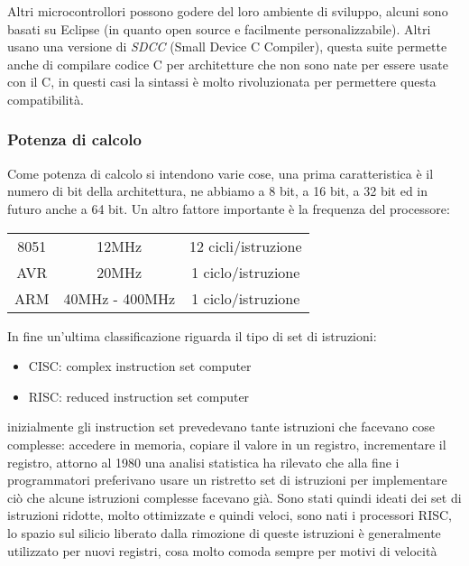 Altri microcontrollori possono godere del loro ambiente di sviluppo, alcuni sono basati su Eclipse (in quanto open source e facilmente personalizzabile). Altri usano una versione di \emph{SDCC} (Small Device C Compiler), questa suite permette anche di compilare codice C per architetture che non sono nate per essere usate con il C, in questi casi la sintassi è molto rivoluzionata per permettere questa compatibilità.

\subsubsection{Potenza di calcolo}
Come potenza di calcolo si intendono varie cose, una prima caratteristica è il numero di bit della architettura, ne abbiamo a 8 bit, a 16 bit, a 32 bit ed in futuro anche a 64 bit. Un altro fattore importante è la frequenza del processore:

\begin{table}[H]
    \centering
    \begin{tabular}{c c c}
    8051 & 12MHz & 12 cicli/istruzione \\
    AVR & 20MHz & 1 ciclo/istruzione \\
    ARM & 40MHz - 400MHz & 1 ciclo/istruzione \\
    \end{tabular}
\end{table}

In fine un'ultima classificazione riguarda il tipo di set di istruzioni:
\begin{itemize}
    \item CISC: complex instruction set computer
    \item RISC: reduced instruction set computer
\end{itemize}
inizialmente gli instruction set prevedevano tante istruzioni che facevano cose complesse: accedere in memoria, copiare il valore in un registro, incrementare il registro, attorno al 1980 una analisi statistica ha rilevato che alla fine i programmatori preferivano usare un ristretto set di istruzioni per implementare ciò che alcune istruzioni complesse facevano già.
Sono stati quindi ideati dei set di istruzioni ridotte, molto ottimizzate e quindi veloci, sono nati i processori RISC, lo spazio sul silicio liberato dalla rimozione di queste istruzioni è generalmente utilizzato per nuovi registri, cosa molto comoda sempre per motivi di velocità






